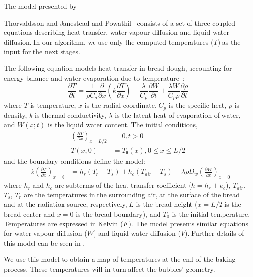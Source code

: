 \documentclass[final,5p,times]{elsarticle}
\begin{document}
The model presented by {Thorvaldsson and Janestead \cite{Thorvaldsson1999} and Powathil~\cite{Powathil2004} consists of a set of three coupled equations describing heat transfer, water vapour diffusion and liquid water diffusion. In our algorithm,  we use only the computed temperatures ($T$) as the input for the next stages. %

The following equation models heat transfer in bread dough, accounting for energy balance and water evaporation due to temperature~\cite{Thorvaldsson1999}:
%
\begin{equation}
\frac{\partial T}{\partial t} = \frac{1}{\rho C_{p}} \frac{\partial}{\partial x} \left ( k \frac{\partial T}{\partial x} \right ) + \frac{\lambda}{C_{p}} \frac{\partial W}{\partial t}+\frac{\lambda W}{ C_{p} \rho}\frac{\partial \rho}{\partial t}
\end{equation}
%
where $T$ is temperature, $x$ is the radial coordinate, $C_{p}$ is the specific heat, $\rho$ is density, $k$ is thermal conductivity, $\lambda$ is the latent heat of evaporation of water, and $W(x;t)$ is the liquid water content. The initial conditions,
%
\begin{align}
\left ( \frac{\partial T}{\partial x} \right )_{x=L/2} &= 0 , t > 0 \\
T(x,0) &= T_{0}(x), 0\le x \le L/2
\end{align}
and the boundary conditions define the model:
\begin{align}
-k \left ( \frac{\partial T}{\partial x} \right )_{x=0} &= h_{r}(T_{r}-T_{s}) + h_{c}(T_{air}-T_{s}) - \lambda \rho D_{w} \left (\frac{\partial W}{\partial x} \right )_{x=0}
\end{align}
%
where $h_{r}$ and $h_{c}$ are subterms of the heat transfer coefficient ($h = h_{r}+h_{c}$), $T_{air}$, $T_{s}$, $T_{r}$ are the temperatures in the surrounding air, at the surface of the bread and at the radiation source, respectively, $L$ is the bread height ($x = L/2$ is the bread center and $x = 0$ is the bread boundary), and $T_{0}$ is the initial temperature. Temperatures are expressed in Kelvin ($K$). The model presents similar equations for water vapour diffusion ($W$) and  liquid water diffusion ($V$). Further details of this model can be seen in \cite{Thorvaldsson1999}.

We use this model to obtain a map of temperatures at the end of the baking process. These temperatures will in turn affect the bubbles' geometry.

}
\end{document}
